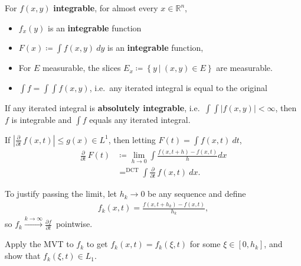 \begin{theorem}

For \(f(x, y)\) \textbf{integrable}, for almost every
\(x\in {\mathbb{R}}^n\),

\begin{itemize}
\tightlist
\item
  \(f_x(y)\) is an \textbf{integrable} function
\item
  \(F(x) \coloneqq\int f(x, y) ~dy\) is an \textbf{integrable} function,
\item
  For \(E\) measurable, the slices
  \(E_x \coloneqq\left\{{y {~\mathrel{\Big|}~}(x, y) \in E}\right\}\)
  are measurable.
\item
  \(\int f = \int \int f(x,y)\), i.e.~any iterated integral is equal to
  the original
\end{itemize}

\end{theorem}

\begin{theorem}

If any iterated integral is \textbf{absolutely integrable},
i.e.~\(\int \int {\left\lvert {f(x, y)} \right\rvert} < \infty\), then
\(f\) is integrable and \(\int f\) equals any iterated integral.

\end{theorem}

\begin{proposition}

If
\({\left\lvert {{\frac{\partial }{\partial t}\,}f(x, t)} \right\rvert} \leq g(x) \in L^1\),
then letting \(F(t) = \int f(x, t) ~dt\),
\begin{align*}
{\frac{\partial }{\partial t}\,} F(t)
&\coloneqq\lim_{h \rightarrow 0} \int \frac{f(x, t+h)-f(x, t)}{h} d x \\
&\mathop{\mathrm{=}}^{\scriptstyle\text{DCT}} \int {\frac{\partial }{\partial t}\,} f(x, t) ~dx
.\end{align*}

To justify passing the limit, let \(h_k \to 0\) be any sequence and
define
\begin{align*}
f_k(x, t) = \frac{f(x, t+h_k)-f(x, t)}{h_k}
,\end{align*}
so
\(f_k \overset{k\to\infty}\longrightarrow{\frac{\partial f}{\partial t}\,}\)
pointwise.

Apply the MVT to \(f_k\) to get \(f_k(x, t) = f_k(\xi, t)\) for some
\(\xi \in [0, h_k]\), and show that \(f_k(\xi, t) \in L_1\).

\end{proposition}

